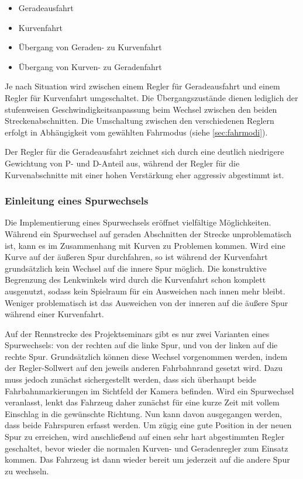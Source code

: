 \begin{itemize}
	\item Geradeausfahrt
	\item Kurvenfahrt
	\item Übergang von Geraden- zu Kurvenfahrt
	\item Übergang von Kurven- zu Geradenfahrt
\end{itemize}

Je nach Situation wird zwischen einem Regler für Geradeausfahrt und einem Regler für Kurvenfahrt umgeschaltet. Die Übergangszustände dienen lediglich der stufenweisen Geschwindigkeitsanpassung beim Wechsel zwischen den beiden Streckenabschnitten. Die Umschaltung zwischen den verschiedenen Reglern erfolgt in Abhängigkeit vom gewählten Fahrmodus (siehe \autoref{sec:fahrmodi}).

Der Regler für die Geradeausfahrt zeichnet sich durch eine deutlich niedrigere Gewichtung von P- und D-Anteil aus, während der Regler für die Kurvenabschnitte mit einer hohen Verstärkung eher aggressiv abgestimmt ist.


\subsubsection{Einleitung eines Spurwechsels}
\label{sec:spurwechsel}
Die Implementierung eines Spurwechsels eröffnet vielfältige Möglichkeiten. Während ein Spurwechsel auf geraden Abschnitten der Strecke unproblematisch ist, kann es im Zusammenhang mit Kurven zu Problemen kommen. Wird eine Kurve auf der äußeren Spur durchfahren, so ist während der Kurvenfahrt grundsätzlich kein Wechsel auf die innere Spur möglich. Die konstruktive Begrenzung des Lenkwinkels wird durch die Kurvenfahrt schon komplett ausgenutzt, sodass kein Spielraum für ein Ausweichen nach innen mehr bleibt. Weniger problematisch ist das Ausweichen von der inneren auf die äußere Spur während einer Kurvenfahrt.

Auf der Rennstrecke des Projektseminars gibt es nur zwei Varianten eines Spurwechsels: von der rechten auf die linke Spur, und von der linken auf die rechte Spur. Grundsätzlich können diese Wechsel vorgenommen werden, indem der Regler-Sollwert auf den jeweils anderen Fahrbahnrand gesetzt wird. Dazu muss jedoch zunächst sichergestellt werden, dass sich überhaupt beide Fahrbahnmarkierungen im Sichtfeld der Kamera befinden. Wird ein Spurwechsel veranlasst, lenkt das Fahrzeug daher zunächst für eine kurze Zeit mit vollem Einschlag in die gewünschte Richtung. Nun kann davon ausgegangen werden, dass beide Fahrspuren erfasst werden. Um zügig eine gute Position in der neuen Spur zu erreichen, wird anschließend auf einen sehr hart abgestimmten Regler geschaltet, bevor wieder die normalen Kurven- und Geradenregler zum Einsatz kommen. Das Fahrzeug ist dann wieder bereit um jederzeit auf die andere Spur zu wechseln.


